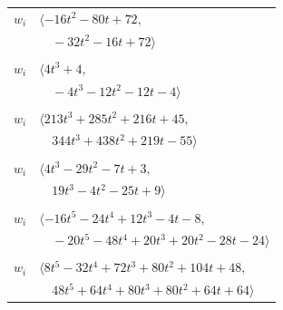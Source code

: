 \documentclass[11pt]{article}
\begin{document}
\begin{longtable}{@{}ll@{}}
$w_i$ & $\langle -16t^{2}-80t+72,$\\
 & $\quad -32t^{2}-16t+72\rangle$\\
\addlinespace[2pt]
\multicolumn{2}{@{}p{0.97\textwidth}@{}}{$i=38$, $D_i=4$, $\rho_{ij}$: $4{:}2, \allowbreak 8{:}1, \allowbreak 9{:}1, \allowbreak 19{:}2, \allowbreak 20{:}1, \allowbreak 24{:}2, \allowbreak 42{:}1, \allowbreak 52{:}1$}\\
$w_i$ & $\langle 4t^{3}+4,$\\
 & $\quad -4t^{3}-12t^{2}-12t-4\rangle$\\
\addlinespace[2pt]
\multicolumn{2}{@{}p{0.97\textwidth}@{}}{$i=39$, $D_i=8$, $\rho_{ij}$: $0{:}1, \allowbreak 1{:}1, \allowbreak 4{:}1, \allowbreak 15{:}1, \allowbreak 24{:}2, \allowbreak 25{:}2, \allowbreak 28{:}2, \allowbreak 29{:}1, \allowbreak 32{:}2, \allowbreak 33{:}1, \allowbreak 52{:}2, \allowbreak 55{:}2, \allowbreak 56{:}1$}\\
$w_i$ & $\langle 213t^{3}+285t^{2}+216t+45,$\\
 & $\quad 344t^{3}+438t^{2}+219t-55\rangle$\\
\addlinespace[2pt]
\multicolumn{2}{@{}p{0.97\textwidth}@{}}{$i=40$, $D_i=4$, $\rho_{ij}$: $2{:}2, \allowbreak 7{:}2, \allowbreak 8{:}2, \allowbreak 17{:}1, \allowbreak 18{:}1, \allowbreak 27{:}1, \allowbreak 34{:}1, \allowbreak 53{:}1$}\\
$w_i$ & $\langle 4t^{3}-29t^{2}-7t+3,$\\
 & $\quad 19t^{3}-4t^{2}-25t+9\rangle$\\
\addlinespace[2pt]
\multicolumn{2}{@{}p{0.97\textwidth}@{}}{$i=41$, $D_i=4$, $\rho_{ij}$: $17{:}1, \allowbreak 19{:}1, \allowbreak 23{:}2, \allowbreak 29{:}1, \allowbreak 30{:}2, \allowbreak 51{:}2, \allowbreak 59{:}1, \allowbreak 61{:}1$}\\
$w_i$ & $\langle -16t^{5}-24t^{4}+12t^{3}-4t-8,$\\
 & $\quad -20t^{5}-48t^{4}+20t^{3}+20t^{2}-28t-24\rangle$\\
\addlinespace[2pt]
\multicolumn{2}{@{}p{0.97\textwidth}@{}}{$i=42$, $D_i=4$, $\rho_{ij}$: $6{:}1, \allowbreak 14{:}1, \allowbreak 15{:}1, \allowbreak 16{:}1, \allowbreak 29{:}2, \allowbreak 37{:}2, \allowbreak 38{:}2, \allowbreak 45{:}1, \allowbreak 48{:}1, \allowbreak 50{:}1, \allowbreak 53{:}1, \allowbreak 61{:}1, \allowbreak 62{:}2$}\\
$w_i$ & $\langle 8t^{5}-32t^{4}+72t^{3}+80t^{2}+104t+48,$\\
 & $\quad 48t^{5}+64t^{4}+80t^{3}+80t^{2}+64t+64\rangle$\\

\end{longtable}
\end{document}
